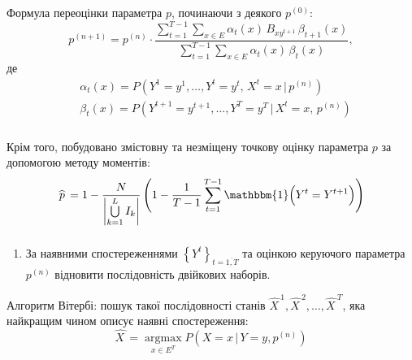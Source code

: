 \documentclass[12pt,mathserif]{beamer}
\DeclareMathOperator*{\argmax}{argmax}
\theoremstyle{plain}
\begin{document}
\begin{frame}
    \frametitle{\insertsection}
    Формула переоцінки параметра $p$, починаючи з деякого $p^{(0)}:$
    \begin{equation*}
        p^{(n+1)} = p^{(n)}\cdot\frac{\sum\limits_{t=1}^{T-1}\sum\limits_{x \in E} \alpha_t(x)\,B_{xy^{t+1}}\,\beta_{t+1}(x)}{\sum\limits_{t=1}^{T-1}\sum\limits_{x \in E} \alpha_t(x)\,\beta_t(x)},
    \end{equation*}
    де 
    \begin{align*}
        & \alpha_t(x) = P\left( Y^1=y^1,\ldots,Y^t=y^t,\,X^t=x \,|\, p^{(n)} \right) \\
        & \beta_t(x) = P\left( Y^{t+1}=y^{t+1},\ldots,Y^T=y^T \,|\, X^t=x,\, p^{(n)} \right)
    \end{align*}
\end{frame}

\begin{frame}
    \frametitle{\insertsection}
    Крім того, побудовано змістовну та незміщену точкову оцінку параметра $p$ за допомогою методу моментів:
    \begin{equation*}
        \widehat{\,p\,} = 1-\frac{N}{\left| \bigcup\limits_{k=1}^{L}I_k \right|} \left( 1-\frac{1}{T-1}\sum_{t=1}^{T-1}\mathbbm{1} \Bigl( Y^t=Y^{t+1} \Bigr) \right)
    \end{equation*}
\end{frame}

\begin{frame}[t]
    \frametitle{\insertsection}
    \begin{enumerate}[2]
        \item За наявними спостереженнями $\left\{ Y^t \right\}_{t=\overline{1,T}}$ та оцінкою керуючого параметра $p^{(n)}$ відновити послідовність двійкових наборів.
    \end{enumerate}
    \vspace{0.5cm}

    Алгоритм Вітербі: пошук такої послідовності станів $\widehat{X\,}^1,\widehat{X\,}^2,\ldots,\widehat{X\,}^T$, яка найкращим чином описує наявні спостереження:
    \begin{equation*}
        \widehat{X\,} = \argmax\limits_{x \in E^T} P\left( X=x\,|\,Y=y,p^{(n)} \right)
    \end{equation*}
\end{frame} 
\end{document}
